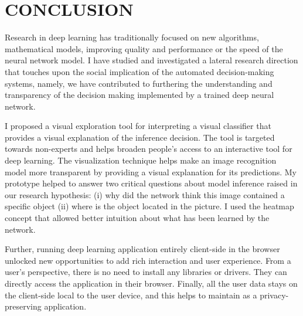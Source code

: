 %
%

\chapter{CONCLUSION}
\thispagestyle{empty}




Research in deep learning has traditionally focused on new algorithms, mathematical models, improving quality and performance or the speed of the neural network model. I have studied and investigated a lateral research direction that touches upon the social implication of the automated decision-making systems, namely, we have contributed to furthering the understanding and transparency of the decision making implemented by a trained deep neural network. 

I proposed a visual exploration tool for interpreting a visual classifier that provides a visual explanation of the inference decision. The tool is targeted towards non-experts and helps broaden people's access to an interactive tool for deep learning. The visualization technique helps make an image recognition model more transparent by providing a visual explanation for its predictions. My prototype helped to answer two critical questions about model inference raised in our research hypothesis: (i) why did the network think this image contained a specific object (ii) where is the object located in the picture. I used the heatmap concept that allowed better intuition about what has been learned by the network.

Further, running deep learning application entirely client-side in the browser unlocked new opportunities to add rich interaction and user experience. From a user's perspective, there is no need to install any libraries or drivers. They can directly access the application in their browser. Finally, all the user data stays on the client-side local to the user device, and this helps to maintain as a privacy-preserving application.

